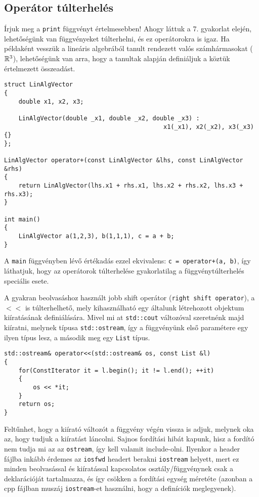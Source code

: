 \documentclass[a4paper,11.5pt]{article}
\begin{document}
	\subsection{Operátor túlterhelés}
	\medskip
	Írjuk meg a \texttt{print} függvényt értelmesebben! Ahogy láttuk a 7. gyakorlat elején, lehetőségünk van függvényeket túlterhelni, és ez operátorokra is igaz. Ha példaként vesszük a lineáris algebrából tanult rendezett valós számhármasokat ($\mathbb{R}^3$), lehetőségünk van arra, hogy a tanultak alapján definiáljuk a köztük értelmezett összeadást.
	\begin{lstlisting}
struct LinAlgVector
{
	double x1, x2, x3;
	
	LinAlgVector(double _x1, double _x2, double _x3) : 
											x1(_x1), x2(_x2), x3(_x3) {}
};

LinAlgVector operator+(const LinAlgVector &lhs, const LinAlgVector &rhs)
{
	return LinAlgVector(lhs.x1 + rhs.x1, lhs.x2 + rhs.x2, lhs.x3 + rhs.x3);
}

int main()
{
	LinAlgVector a(1,2,3), b(1,1,1), c = a + b;
}
	\end{lstlisting}
	A \texttt{main} függvényben lévő értékadás ezzel ekvivalens: \texttt{c = operator+(a, b)}, így láthatjuk, hogy az operátorok túlterhelése gyakorlatilag a függvénytúlterhelés speciális esete. 
	\smallskip 
	
	A gyakran beolvasáshoz használt jobb shift operátor (\texttt{right shift operator}), a $<<$ is túlterhelhető, mely kihasználható egy általunk létrehozott objektum kiíratásának definiálására. Mivel mi at \texttt{std::cout} változóval szeretnénk majd kiíratni, melynek típusa \texttt{std::ostream}, így a függvényünk első paramétere egy ilyen típus lesz, a második meg egy \texttt{List} típus.
	
	\begin{lstlisting}
std::ostream& operator<<(std::ostream& os, const List &l)
{
	for(ConstIterator it = l.begin(); it != l.end(); ++it)
	{
		os << *it;
	}
	return os;
}
	\end{lstlisting}
	
	Feltűnhet, hogy a kiírató változót a függvény végén vissza is adjuk, melynek oka az, hogy tudjuk a kiíratást láncolni. Sajnos fordítási hibát kapunk, hisz a fordító nem tudja mi az az \texttt{ostream}, így kell valamit include-olni. Ilyenkor a header fájlba inkább érdemes az \texttt{iosfwd} headert berakni \texttt{iostream} helyett, mert ez minden beolvasással és kiíratással kapcsolatos osztály/függvénynek csak a deklarációját tartalmazza, és így csökken a fordítási egység méretéte (azonban a cpp fájlban muszáj \texttt{iostream}-et használni, hogy a definíciók meglegyenek).
	
\end{document}
